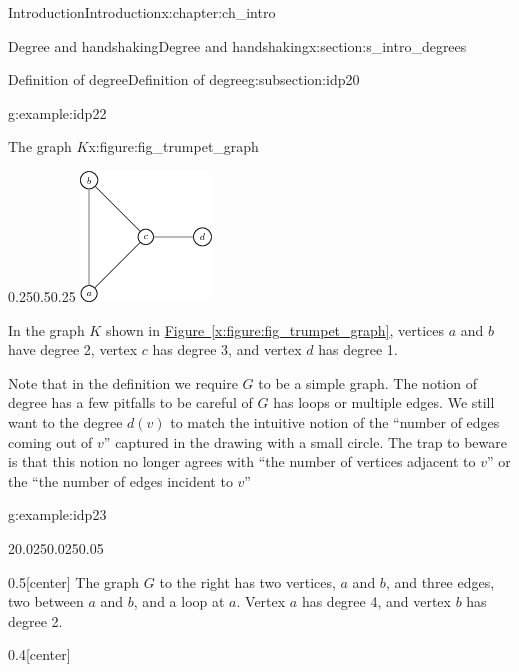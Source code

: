 \documentclass[oneside,10pt,]{book}
\newcommand{\xreffont}{\relax}
\numberwithin{equation}{section}
\begin{document}
\begin{chapterptx}{Introduction}{}{Introduction}{}{}{x:chapter:ch_intro}
\begin{sectionptx}{Degree and handshaking}{}{Degree and handshaking}{}{}{x:section:s_intro_degrees}
\begin{subsectionptx}{Definition of degree}{}{Definition of degree}{}{}{g:subsection:idp20}
\begin{example}{}{g:example:idp22}
\begin{figureptx}{The graph \(K\)}{x:figure:fig_trumpet_graph}{}
\begin{image}{0.25}{0.5}{0.25}
\includegraphics[width=\linewidth]{images/degreeexamplegraph.png}
\end{image}%
\tcblower
\end{figureptx}%
In the graph \(K\) shown in \hyperref[x:figure:fig_trumpet_graph]{Figure~{\xreffont\ref{x:figure:fig_trumpet_graph}}}, vertices \(a\) and \(b\) have degree 2, vertex \(c\) has degree 3, and vertex \(d\) has degree 1.%
\end{example}
Note that in the definition we require \(G\) to be a simple graph.  The notion of degree has a few pitfalls to be careful of \(G\) has loops or multiple edges.  We still want to the degree \(d(v)\) to match the intuitive notion of the ``number of edges coming out of \(v\)'' captured in the drawing with a small circle.  The trap to beware is that this notion no longer agrees with ``the number of vertices adjacent to \(v\)'' or the ``the number of edges incident to \(v\)''%
\begin{example}{}{g:example:idp23}%
\begin{sidebyside}{2}{0.025}{0.025}{0.05}%
\begin{sbspanel}{0.5}[center]%
The graph \(G\) to the right has two vertices, \(a\) and \(b\), and three edges, two between \(a\) and \(b\), and a loop at \(a\).  Vertex \(a\) has degree 4, and vertex \(b\) has degree 2.%
\end{sbspanel}%
\begin{sbspanel}{0.4}[center]%
\resizebox{\linewidth}{!}{%
\begin{tikzpicture}[scale=2, every loop/.style={}, bend angle=10]


\end{tikzpicture}}
\end{sbspanel}
\end{sidebyside}
\end{example}
\end{subsectionptx}
\end{sectionptx}
\end{chapterptx}
\end{document}
